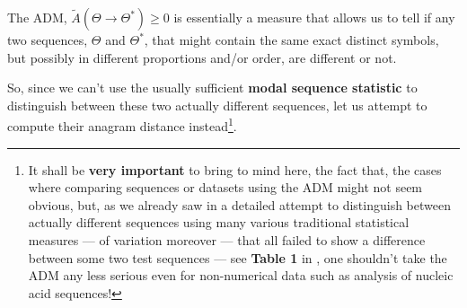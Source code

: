 \documentclass[a4paper, 18pt]{book} %
\begin{document}
The ADM, $\tilde{A}(\Theta \rightarrow \Theta^*) \geq 0$ is essentially a measure that allows us to tell if any two sequences, $\Theta$ and $\Theta^*$, that might contain the same exact distinct symbols, but possibly in different proportions and/or order, are different or not. 

So, since we can't use the usually sufficient \textbf{modal sequence statistic}\cite{transformatics} to distinguish between these two actually different sequences, let us attempt to compute their anagram distance instead\footnote{It shall be \textbf{very important} to bring to mind here, the fact that, the cases where comparing sequences or datasets using the ADM might not seem obvious, but, as we already saw in a detailed attempt to distinguish between actually different sequences using many various traditional statistical measures  --- of variation moreover --- that all failed to show a difference between some two test sequences --- see \textbf{Table 1} in \cite{transformatics}, one shouldn't take the ADM any less serious even for non-numerical data such as analysis of nucleic acid sequences!}. 
\end{document}
